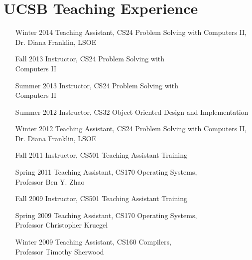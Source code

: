 \documentclass[10pt,letterpaper,oneside,twocolumn]{article}
\begin{document}
\section{UCSB Teaching Experience}
\begin{itemize}
  \item [Winter 2014] Teaching Assistant, CS24 Problem Solving with Computers
    II, Dr. Diana Franklin, LSOE
  \item [Fall 2013] Instructor, CS24 Problem Solving with\\ Computers II
  \item [Summer 2013] Instructor, CS24 Problem Solving with\\ Computers II
  \item [Summer 2012] Instructor, CS32 Object Oriented Design and
    Implementation
  \item [Winter 2012] Teaching Assistant, CS24 Problem Solving with Computers
    II, Dr. Diana Franklin, LSOE
  \item [Fall 2011] Instructor, CS501 Teaching Assistant Training
  \item [Spring 2011] Teaching Assistant, CS170 Operating Systems,\\ Professor
    Ben Y. Zhao
  \item [Fall 2009] Instructor, CS501 Teaching Assistant Training
  \item [Spring 2009] Teaching Assistant, CS170 Operating Systems,\\ Professor
    Christopher Kruegel
  \item [Winter 2009] Teaching Assistant, CS160 Compilers,\\ Professor Timothy
    Sherwood
\end{itemize}
\end{document}
